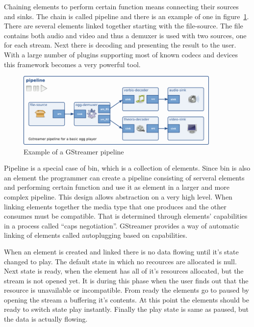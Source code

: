 Chaining elements to perform certain function means connecting their sources and sinks. The chain is called pipeline and there is an example of one in figure~\ref{fig:gstreamerPipeline}. There are several elements linked together starting with the file-source. The file contains both audio and video and thus a demuxer is used with two sources, one for each stream. Next there is decoding and presenting the result to the user. With a large number of plugins supporting most of known codecs and devices this framework becomes a very powerful tool. 

\begin{figure}[ht]
	\begin{center}
	\includegraphics[width=10cm]{fig/gstreamer-pipeline.png}
	\caption{Example of a GStreamer pipeline}
	\label{fig:gstreamerPipeline}
\end{center}
\end{figure}

Pipeline is a special case of bin, which is a collection of elements. Since bin is also an element the programmer can create a pipeline consisting of serveral elements and performing certain function and use it as element in a larger and more complex pipeline. This design allows abstraction on a very high level. When linking elements together the media type that one produces and the other consumes must be compatible. That is determined through elements' capabilities in a process called ``caps negotiation''. GStreamer provides a way of automatic linking of elements called autoplugging based on capabilities. 

When an element is created and linked there is no data flowing until it's state changed to play. The default state in which no recources are allocated is null. Next state is ready, when the element has all of it's resources allocated, but the stream is not opened yet. It is during this phase when the user finds out that the resource is unavailable or incompatible. From ready the elements go to paused by opening the stream a buffering it's contents. At this point the elements should be ready to switch state play instantly. Finally the play state is same as paused, but the data is actually flowing. 

